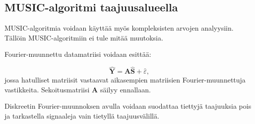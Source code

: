 \subsection{MUSIC-algoritmi taajuusalueella}
MUSIC-algoritmia voidaan käyttää myös kompleksisten arvojen analyysiin. Tällöin MUSIC-algoritmiin ei tule mitää muutoksia.

Fourier-muunnettu datamatriisi voidaan esittää:

\begin{equation}
    \hat{\mathbf{Y}} = \mathbf{A}\hat{\mathbf{S}} + \hat{\varepsilon},
\end{equation}
jossa hatulliset matriisit vastaavat aikasempien matriisien Fourier-muunnettuja vastikkeita. Sekoitusmatriisi $\mathbf{A}$ säilyy ennallaan.

Diskreetin Fourier-muunnoksen avulla voidaan suodattaa tiettyjä taajuuksia pois ja tarkastella signaaleja vain tietyllä taajuusvälillä.